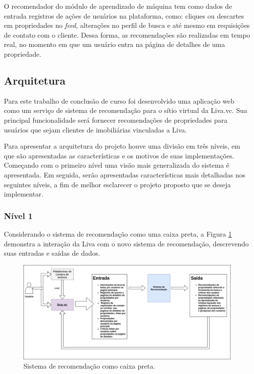 O recomendador do módulo de aprendizado de máquina tem como dados de entrada registros de ações de usuários na plataforma, como: cliques ou descartes em propriedades no \textit{feed}, alterações no perfil de busca e até mesmo em requisições de contato com o cliente. Dessa forma, as recomendações são realizadas em tempo real, no momento em que um usuário entra na página de detalhes de uma propriedade.

\subsection{Arquitetura}

Para este trabalho de conclusão de curso foi desenvolvido uma aplicação web como um serviço de sistema de recomendação para o sítio virtual da Liva.vc. Sua principal funcionalidade será fornecer recomendações de propriedades para usuários que sejam clientes de imobiliárias vinculadas a Liva.

Para apresentar a arquitetura do projeto houve uma divisão em três níveis, em que são apresentadas as características e os motivos de suas implementações. Começando com o primeiro nível uma visão mais generalizada do sistema é apresentada. Em seguida, serão apresentadas características mais detalhadas nos seguintes níveis, a fim de melhor esclarecer o projeto proposto que se deseja implementar. 

\subsubsection{Nível 1}

Considerando o sistema de recomendação como uma caixa preta, a Figura \ref{fig:sr_nivel1} demonstra a interação da Liva com o novo sistema de recomendação, descrevendo suas entradas e saídas de dados.

\begin{figure}[H]
    \centering
    \includegraphics[scale=0.4]{figuras/proposta/sr_nivel1.png}
    \caption[Sistema de recomendação como caixa preta]{Sistema de recomendação como caixa preta.}
    \label{fig:sr_nivel1}
\end{figure}

